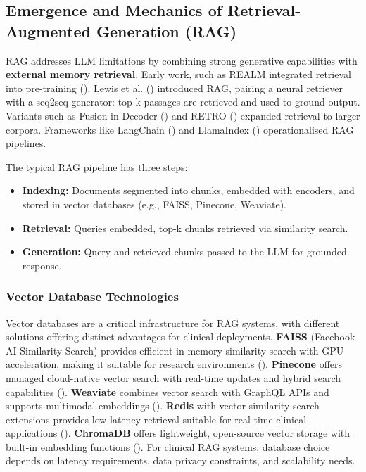 \subsection{Emergence and Mechanics of Retrieval-Augmented Generation (RAG)}

RAG addresses LLM limitations by combining strong generative capabilities with \textbf{external memory retrieval}. Early work, such as REALM integrated retrieval into pre-training (\citep{guu2020realm}). Lewis et al. (\citeyear{lewis2020rag}) introduced RAG, pairing a neural retriever with a seq2seq generator: top-k passages are retrieved and used to ground output. Variants such as Fusion-in-Decoder (\citep{izacard2021leveraging}) and RETRO (\citep{borgeaud2022retro}) expanded retrieval to larger corpora. Frameworks like LangChain (\citep{langchain2023}) and LlamaIndex (\citep{llamaindex2023}) operationalised RAG pipelines.

The typical RAG pipeline has three steps:
\begin{itemize}
  \item \textbf{Indexing:} Documents segmented into chunks, embedded with encoders, and stored in vector databases (e.g., FAISS, Pinecone, Weaviate).
  \item \textbf{Retrieval:} Queries embedded, top-k chunks retrieved via similarity search.
  \item \textbf{Generation:} Query and retrieved chunks passed to the LLM for grounded response.
\end{itemize}

\subsubsection{Vector Database Technologies}
Vector databases are a critical infrastructure for RAG systems, with different solutions offering distinct advantages for clinical deployments. \textbf{FAISS} (Facebook AI Similarity Search) provides efficient in-memory similarity search with GPU acceleration, making it suitable for research environments (\citep{douze2025faiss}). \textbf{Pinecone} offers managed cloud-native vector search with real-time updates and hybrid search capabilities (\citep{pinecone2023}). \textbf{Weaviate} combines vector search with GraphQL APIs and supports multimodal embeddings (\citep{weaviate2023}). \textbf{Redis} with vector similarity search extensions provides low-latency retrieval suitable for real-time clinical applications (\citep{redis2023vector}). \textbf{ChromaDB} offers lightweight, open-source vector storage with built-in embedding functions (\citep{chromadb2023}). For clinical RAG systems, database choice depends on latency requirements, data privacy constraints, and scalability needs.

